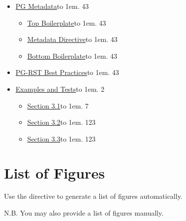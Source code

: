 \documentclass[a5paper]{book}
\begin{document}
\begin{german}
\begin{contents_env}
\begin{itemize}
\begin{itemize}
\item[] \hyperlink{tables}{Tables}\leaders\hbox to 1em{\hss.\hss}\hfill{} 43
\end{itemize}

\item[] \hyperlink{pg-metadata}{PG Metadata}\leaders\hbox to 1em{\hss.\hss}\hfill{} 43
\begin{itemize}
\item[] \hyperlink{top-boilerplate}{Top Boilerplate}\leaders\hbox to 1em{\hss.\hss}\hfill{} 43

\item[] \hyperlink{metadata-directive}{Metadata Directive}\leaders\hbox to 1em{\hss.\hss}\hfill{} 43

\item[] \hyperlink{bottom-boilerplate}{Bottom Boilerplate}\leaders\hbox to 1em{\hss.\hss}\hfill{} 43
\end{itemize}

\item[] \hyperlink{pg-rst-best-practices}{PG-RST Best Practices}\leaders\hbox to 1em{\hss.\hss}\hfill{} 43

\item[] \hyperlink{tests-and-examples}{Examples and Tests}\leaders\hbox to 1em{\hss.\hss}\hfill{} 2
\begin{itemize}
\item[] \hyperlink{section-3-1}{Section 3.1}\leaders\hbox to 1em{\hss.\hss}\hfill{} 7

\item[] \hyperlink{section-3-2}{Section 3.2}\leaders\hbox to 1em{\hss.\hss}\hfill{} 123

\item[] \hyperlink{section-3-3}{Section 3.3}\leaders\hbox to 1em{\hss.\hss}\hfill{} 123
\end{itemize}
\end{itemize}
\end{contents_env}

%
\label{list-of-figures}%
\hypertarget{list-of-figures}{}%
%
\section*{List of Figures}


Use the {} directive to generate a list of figures
automatically.\par

N.B. You may also provide a list of figures manually.\par


\end{german}
\end{document}
